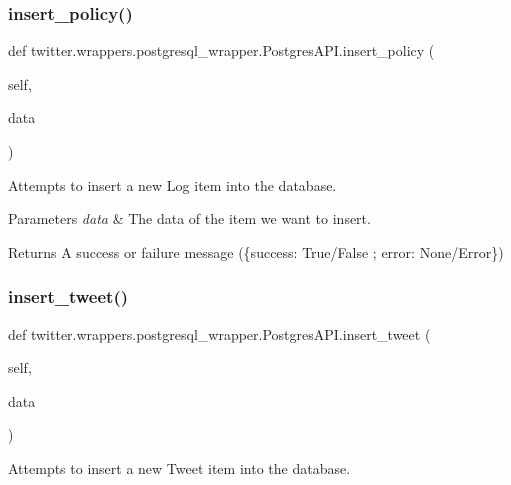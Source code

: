 \subsubsection{\texorpdfstring{insert\+\_\+policy()}{insert\_policy()}}
{\footnotesize\ttfamily def twitter.\+wrappers.\+postgresql\+\_\+wrapper.\+Postgres\+A\+P\+I.\+insert\+\_\+policy (\begin{DoxyParamCaption}\item[{}]{self,  }\item[{}]{data }\end{DoxyParamCaption})}



Attempts to insert a new Log item into the database. 


\begin{DoxyParams}{Parameters}
{\em data} & The data of the item we want to insert. \\
\hline
\end{DoxyParams}
\begin{DoxyReturn}{Returns}
A success or failure message (\{success\+: True/\+False ; error\+: None/\+Error\}) 
\end{DoxyReturn}
\mbox{\label{classtwitter_1_1wrappers_1_1postgresql__wrapper_1_1PostgresAPI_a6b2b617a04ade9f12c63996210b2287b}} 
\subsubsection{\texorpdfstring{insert\+\_\+tweet()}{insert\_tweet()}}
{\footnotesize\ttfamily def twitter.\+wrappers.\+postgresql\+\_\+wrapper.\+Postgres\+A\+P\+I.\+insert\+\_\+tweet (\begin{DoxyParamCaption}\item[{}]{self,  }\item[{}]{data }\end{DoxyParamCaption})}



Attempts to insert a new Tweet item into the database. 


